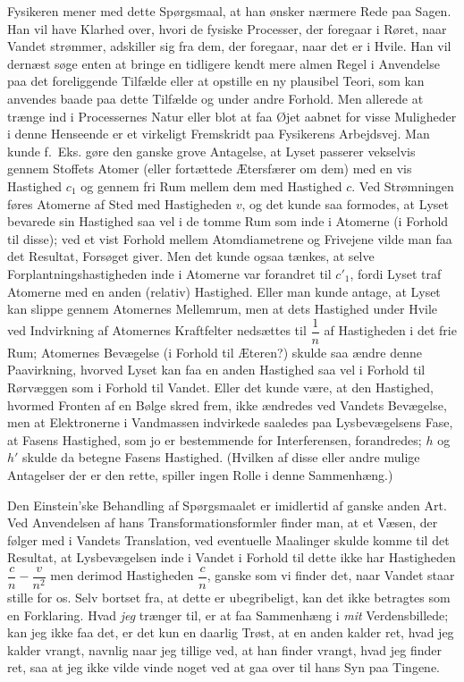 \documentclass[12pt,a4paper]{article}
\newcommand{\opage}[1]{\marginnote{\footnotesize\textit{[#1]}}}
\begin{document}
Fysikeren mener med dette Spørgsmaal, at han ønsker nærmere Rede paa Sagen. Han
vil have Klarhed over, hvori de fysiske Processer, der foregaar i Røret, naar
Vandet strømmer, adskiller sig fra dem, der foregaar, naar det er i Hvile. Han
vil dernæst søge enten
\opage{9} at bringe en tidligere kendt mere almen Regel i Anvendelse paa det foreliggende
Tilfælde eller at opstille en ny plausibel Teori, som kan anvendes baade paa
dette Tilfælde og under andre Forhold. Men allerede at trænge ind i
Processernes Natur eller blot at faa Øjet aabnet for visse Muligheder i denne
Henseende er et virkeligt Fremskridt paa Fysikerens Arbejdsvej. Man kunde
f.~Eks. gøre den ganske grove Antagelse, at Lyset passerer vekselvis gennem
Stoffets Atomer (eller fortættede Ætersfærer om dem) med en vis Hastighed
$c_{1}$ og gennem fri Rum mellem dem med Hastighed $c$. Ved Strømningen føres
Atomerne af Sted med Hastigheden $v$, og det kunde saa formodes, at Lyset
bevarede sin Hastighed saa vel i de tomme Rum som inde i Atomerne (i Forhold
til disse); ved et vist Forhold mellem \guillemotleft
Atomdiametrene\guillemotright{} og \guillemotleft Frivejene\guillemotright{}
vilde man faa det Resultat, Forsøget giver. Men det kunde ogsaa tænkes, at
selve Forplantningshastigheden inde i Atomerne var forandret til $c'_{1}$,
fordi Lyset traf Atomerne med en anden (relativ) Hastighed. Eller man kunde
antage, at Lyset kan slippe gennem Atomernes Mellemrum, men at dets Hastighed
under Hvile ved Indvirkning af Atomernes \guillemotleft
Kraftfelter\guillemotright{} nedsættes til $\dfrac{1}{n}$ af Hastigheden i det
frie Rum; Atomernes Bevægelse (i Forhold til Æteren?) skulde saa ændre denne
Paavirkning, hvorved Lyset kan faa en anden Hastighed saa vel i Forhold til
Rørvæggen som i Forhold til Vandet. Eller det kunde være, at den Hastighed,
hvormed Fronten af en Bølge skred frem, ikke ændredes ved Vandets Bevægelse,
men at Elektronerne i Vandmassen indvirkede saaledes paa Lysbevægelsens Fase,
at \guillemotleft Fasens Hastighed\guillemotright, som jo er bestemmende for
Interferensen, forandredes; $h$ og $h'$ skulde da betegne Fasens Hastighed.
(Hvilken af disse eller andre mulige Antagelser der er den rette, spiller ingen
Rolle i denne Sammenhæng.)

Den Einstein'ske Behandling af Spørgsmaalet er imidlertid af ganske anden Art.
Ved Anvendelsen af hans Transformationsformler finder man, at et Væsen, der
følger med i Vandets Translation, ved eventuelle Maalinger skulde komme til det
Resultat, at Lysbevægelsen inde i Vandet i Forhold til dette ikke har
Hastigheden $\dfrac{c}{n} - \dfrac{v}{n^{2}}$ men derimod Hastigheden
$\dfrac{c}{n}$, ganske som vi finder det, naar Vandet staar stille for os. Selv
bortset fra, at dette er ubegribeligt, kan det ikke
\opage{10} betragtes som en Forklaring. Hvad \emph{jeg} trænger til, er at faa
Sammenhæng i \emph{mit} Verdensbillede; kan jeg ikke faa det, er det kun en
daarlig Trøst, at en anden kalder ret, hvad jeg kalder vrangt, navnlig naar jeg
tillige ved, at han finder vrangt, hvad jeg finder ret, saa at jeg ikke vilde
vinde noget ved at gaa over til hans Syn paa Tingene.
\end{document}
